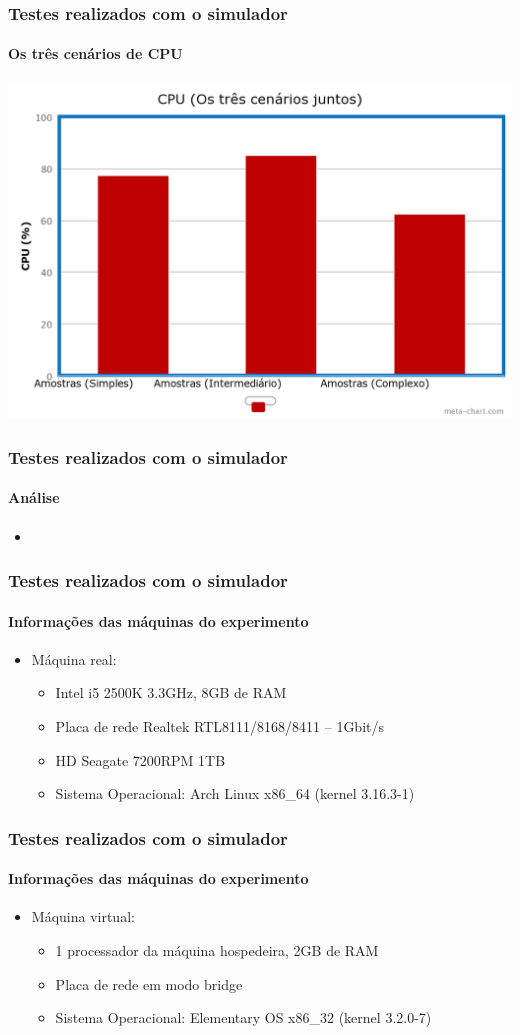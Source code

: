 \documentclass{beamer}
\begin{document}
\begin{frame}
	\frametitle{Testes realizados com o simulador}
	\framesubtitle{Os três cenários de CPU}
	\begin{center}
	\includegraphics[scale=0.18]{chart(7).png}
	\end{center}
\end{frame}

\begin{frame}
	\frametitle{Testes realizados com o simulador}
	\framesubtitle{Análise}
	\begin{itemize}
		\item 
	\end{itemize}
\end{frame}

\begin{frame}
	\frametitle{Testes realizados com o simulador}
	\framesubtitle{Informações das máquinas do experimento}
	\begin{itemize}
		\item Máquina real:
			\begin{itemize}
				\item Intel i5 2500K 3.3GHz, 8GB de RAM
				\item Placa de rede Realtek RTL8111/8168/8411 – 1Gbit/s
				\item HD Seagate 7200RPM 1TB
				\item Sistema Operacional: Arch Linux x86\_64 (kernel 3.16.3-1)
			\end{itemize}
	\end{itemize}
\end{frame}

\begin{frame}
	\frametitle{Testes realizados com o simulador}
	\framesubtitle{Informações das máquinas do experimento}
	\begin{itemize}
		\item Máquina virtual:
			\begin{itemize}
				\item 1 processador da máquina hospedeira, 2GB de RAM
				\item Placa de rede em modo bridge
				\item Sistema Operacional: Elementary OS x86\_32 (kernel 3.2.0-7)
			\end{itemize}
	\end{itemize}
\end{frame}
\end{document}

